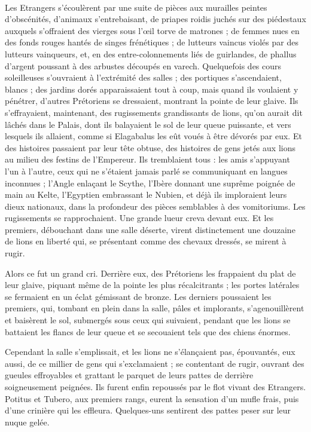 \documentclass[a4paper, 11pt, oneside, polutonikogreek, french]{article}
\begin{document}
\paragraph{}
Les Etrangers s'écoulèrent par une suite de pièces aux murailles peintes d'obscénités, d'animaux s'entrebaisant, de priapes roidis juchés sur des piédestaux auxquels s'offraient des vierges sous l'œil torve de matrones ; de femmes nues en des fonds rouges hantés de singes frénétiques ; de lutteurs vaincus violés par des lutteurs vainqueurs, et, en des entre-colonnements liés de guirlandes, de phallus d'argent poussant à des arbustes découpés en varech. Quelquefois des cours soleilleuses s'ouvraient à l'extrémité des salles ; des portiques s'ascendaient, blancs ; des jardins dorés apparaissaient tout à coup, mais quand ils voulaient y pénétrer, d'autres Prétoriens se dressaient, montrant la pointe de leur glaive. Ils s'effrayaient, maintenant, des rugissements grandissants de lions, qu'on aurait dit lâchés dans le Palais, dont ils balayaient le sol de leur queue puissante, et vers lesquels ils allaient, comme si Elagabalus les eût voués à être dévorés par eux. Et des histoires passaient par leur tête obtuse, des histoires de gens jetés aux lions au milieu des festins de l'Empereur. Ils tremblaient tous : les amis s'appuyant l'un à l'autre, ceux qui ne s'étaient jamais parlé se communiquant en langues inconnues ; l'Angle enlaçant le Scythe, l'Ibère donnant une suprême poignée de main au Kelte, l'Egyptien embrassant le Nubien, et déjà ils imploraient leurs dieux nationaux, dans la profondeur des pièces semblables à des vomitoriums. Les rugissements se rapprochaient. Une grande lueur creva devant eux. Et les premiers, débouchant dans une salle déserte, virent distinctement une douzaine de lions en liberté qui, se présentant comme des chevaux dressés, se mirent à rugir.

Alors ce fut un grand cri. Derrière eux, des Prétoriens les frappaient du plat de leur glaive, piquant même de la pointe les plus récalcitrants ; les portes latérales se fermaient en un éclat gémissant de bronze. Les derniers poussaient les premiers, qui, tombant en plein dans la salle, pâles et implorants, s'agenouillèrent et baisèrent le sol, submergés sous ceux qui suivaient, pendant que les lions se battaient les flancs de leur queue et se secouaient tels que des chiens énormes.

Cependant la salle s'emplissait, et les lions ne s'élançaient pas, épouvantés, eux aussi, de ce millier de gens qui s'exclamaient ; se contentant de rugir, ouvrant des gueules effroyables et grattant le parquet de leurs pattes de derrière soigneusement peignées. Ils furent enfin repoussés par le flot vivant des Etrangers. Potitus et Tubero, aux premiers rangs, eurent la sensation d'un mufle frais, puis d'une crinière qui les effleura. Quelques-uns sentirent des pattes peser sur leur nuque gelée.
\end{document}

